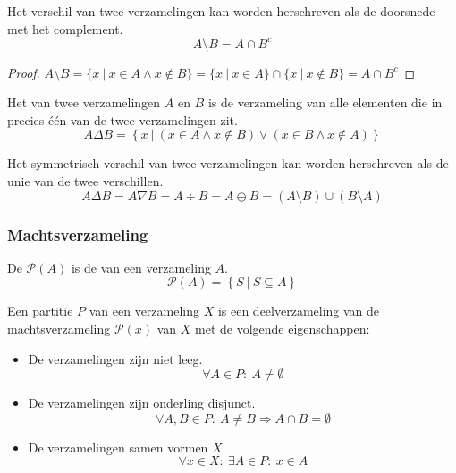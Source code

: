 \documentclass[main.tex]{subfiles}
\begin{document}
\begin{st}
  Het verschil van twee verzamelingen kan worden herschreven als de doorsnede met het complement.
  \[ A \setminus B = A \cap B^{c} \]
  \begin{proof}
    $A \setminus B = \{ x\ |\ x \in A \wedge x \not\in B \} = \{ x\ |\ x \in A \} \cap \{ x\ |\ x \not\in B \} = A \cap B^{c}$
  \end{proof}
\end{st}


\begin{de}
  Het  van twee verzamelingen $A$ en $B$ is de verzameling van alle elementen die in precies \'e\'en van de twee verzamelingen zit.
  \[ A \Delta B = \left\{ x\ |\ (x \in A \wedge x \not\in B) \vee (x \in B \wedge x \not\in A) \right\} \]
\end{de}

\begin{st}
  Het symmetrisch verschil van twee verzamelingen kan worden herschreven als de unie van de twee verschillen.
  \[ A \Delta B = A \nabla B = A \div B = A \ominus B = (A \setminus B) \cup (B \setminus A) \]
\end{st}

\subsubsection{Machtsverzameling}
\label{sec:machtsverzameling}

\begin{de}
  \label{de:machtsverzameling}
  De  $\mathcal P(A)$ is de  van een verzameling $A$.
  \[ \mathcal P(A) = \left\{ S\ |\ S \subseteq A \right\} \]
\end{de}

\begin{de}
  \label{de:partitie}
  Een partitie $P$ van een verzameling $X$ is een deelverzameling van de machtsverzameling $\mathcal {P}(x)$ van $X$ met de volgende eigenschappen:
  \begin{itemize}
  \item De verzamelingen zijn niet leeg.
    \[ \forall A \in P:\ A \neq \emptyset \]
  \item De verzamelingen zijn onderling disjunct.
    \[ \forall A,B \in P:\ A \neq B \Rightarrow A \cap B = \emptyset \]
  \item De verzamelingen samen vormen $X$.
    \[ \forall x \in X:\ \exists A \in P:\ x \in A \]
  \end{itemize}
\end{de}
\end{document}
